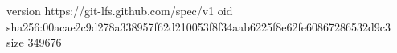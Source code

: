 version https://git-lfs.github.com/spec/v1
oid sha256:00acae2c9d278a338957f62d210053f8f34aab6225f8e62fe60867286532d9c3
size 349676
